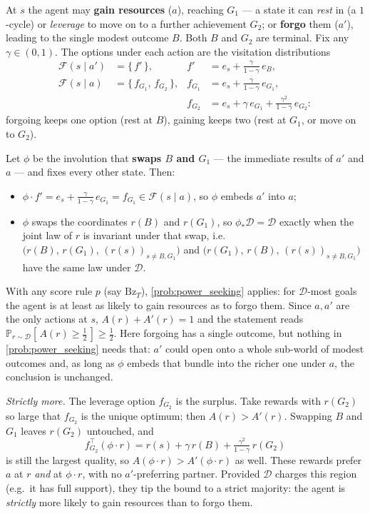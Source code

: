 \documentclass[11pt]{article}
\newcommand{\Prob}{\mathbb{P}}
\newcommand{\Dist}{\mathcal{D}}    %
\newcommand{\F}{\mathcal{F}}       %
\begin{document}
\noindent At $s$ the agent may \textbf{gain resources} ($a$), reaching $G_1$ --- a state it can
\emph{rest} in (a $1$-cycle) or \emph{leverage} to move on to a further achievement $G_2$; or
\textbf{forgo} them ($a'$), leading to the single modest outcome $B$. Both $B$ and $G_2$ are
terminal. Fix any $\gamma \in (0,1)$. The options under each action are the visitation
distributions
\begin{align*}
\F(s\mid a') &= \{\, f' \,\}, & f' &= e_s + \tfrac{\gamma}{1-\gamma}\,e_B, \\[2pt]
\F(s\mid a) &= \{\, f_{G_1},\, f_{G_2} \,\}, & f_{G_1} &= e_s + \tfrac{\gamma}{1-\gamma}\,e_{G_1}, \\[2pt]
& & f_{G_2} &= e_s + \gamma\,e_{G_1} + \tfrac{\gamma^2}{1-\gamma}\,e_{G_2}:
\end{align*}
forgoing keeps one option (rest at $B$), gaining keeps two (rest at $G_1$, or move on to $G_2$).

Let $\phi$ be the involution that \textbf{swaps $B$ and $G_1$} --- the immediate results of $a'$
and $a$ --- and fixes every other state. Then:
\begin{itemize}\itemsep=2pt
  \item[(E)] $\phi\cdot f' = e_s + \tfrac{\gamma}{1-\gamma}\,e_{G_1} = f_{G_1} \in \F(s\mid a)$, so
  $\phi$ embeds $a'$ into $a$;
  \item[(D)] $\phi$ swaps the coordinates $r(B)$ and $r(G_1)$, so $\phi_*\Dist = \Dist$ exactly when
  the joint law of $r$ is invariant under that swap, i.e.\
  $\bigl(r(B),\,r(G_1),\,(r(s))_{s\ne B,G_1}\bigr)$ and
  $\bigl(r(G_1),\,r(B),\,(r(s))_{s\ne B,G_1}\bigr)$ have the same law under $\Dist$.
\end{itemize}
With any score rule $p$ (say $\mathrm{Bz}_T$), \cref{prob:power_seeking} applies: for $\Dist$-most
goals the agent is at least as likely to gain resources as to forgo them. Since $a, a'$ are the only
actions at $s$, $A(r) + A'(r) = 1$ and the statement reads
$\Prob_{r\sim\Dist}[\,A(r) \ge \tfrac12\,] \ge \tfrac12$. Here forgoing has a single outcome, but
nothing in \cref{prob:power_seeking} needs that: $a'$ could open onto a whole sub-world of modest
outcomes and, as long as $\phi$ embeds that bundle into the richer one under $a$, the conclusion is
unchanged.

\emph{Strictly more.} The leverage option $f_{G_2}$ is the surplus. Take rewards with $r(G_2)$ so
large that $f_{G_2}$ is the unique optimum; then $A(r) > A'(r)$. Swapping $B$ and $G_1$ leaves
$r(G_2)$ untouched, and
$$
f_{G_2}^\top(\phi\cdot r) = r(s) + \gamma\,r(B) + \tfrac{\gamma^2}{1-\gamma}\,r(G_2)
$$
is still the largest quality, so $A(\phi\cdot r) > A'(\phi\cdot r)$ as well. These rewards prefer
$a$ at $r$ \emph{and} at $\phi\cdot r$, with no $a'$-preferring partner.
Provided $\Dist$ charges this region (e.g.\ it has full support), they tip the bound to a strict
majority: the agent is \emph{strictly} more likely to gain resources than to forgo them.
\end{document}
